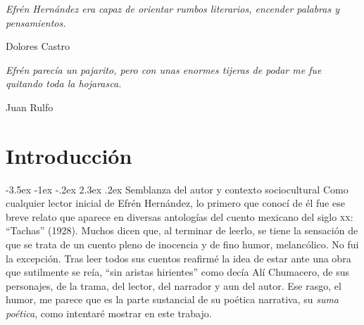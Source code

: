\documentclass[14pt,twoside,final]{extbook} %
\makeatletter
\renewcommand\section{\@startsection {section}{1}{\z@}%
                                     {-3.5ex \@plus -1ex \@minus -.2ex}%
                                     {2.3ex \@plus .2ex}%
                                     {\normalfont\large\bfseries\sc}}
\makeatother
\begin{document}
\vfill
\newpage
\pagestyle{empty}
\vspace*{42pt}
\begin{flushright}
\begin{minipage}{7.5cm}
\emph{Efrén Hernández era capaz de orientar rumbos literarios, encender palabras y pensamientos.}
\begin{flushright}
Dolores Castro
\end{flushright}
\vspace*{28pt}
\emph{Efrén parecía un pajarito, pero con unas enormes tijeras de podar me fue quitando toda la hojarasca.}
\begin{flushright}
Juan Rulfo
\end{flushright}
\end{minipage}
\end{flushright}
\chapter[\textsc{Introducción}]{Introducción}\label{ch:introduccion}
\BgThispage
\pagestyle{empty}
\thispagestyle{empty}
\pagestyle{fancy}
\fancyhf{} %
\fancyhead[RO,LE]{\thepage}
\renewcommand{\headrulewidth}{0pt}
\setcounter{page}{13}
\section{Semblanza del autor y contexto sociocultural}\label{sec:semblanza-del-autor-y-contexto-sociocultural}
Como cualquier lector inicial de Efrén Hernández, lo primero que conocí de él fue ese breve relato que aparece en diversas antologías del cuento mexicano del siglo \textsc{xx}: ``Tachas'' (1928). Muchos dicen que, al terminar de leerlo, se tiene la sensación de que se trata de un cuento pleno de inocencia y de fino humor, melancólico. No fui la excepción. Tras leer todos sus cuentos reafirmé la idea de estar ante una obra que sutilmente se reía, ``sin aristas hirientes'' como decía Alí Chumacero, de sus personajes, de la trama, del lector, del narrador y aun del autor. Ese rasgo, el humor, me parece que es la parte sustancial de su poética narrativa, su \emph{suma poética}, como intentaré mostrar en este trabajo.
\end{document}
